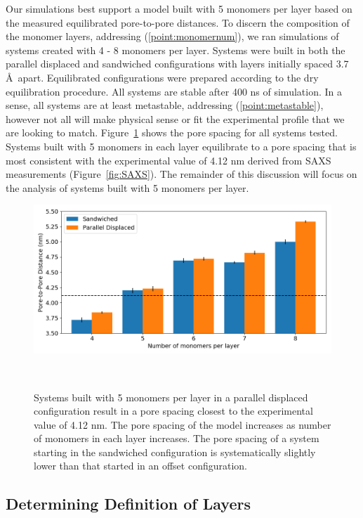 \documentclass{article}
\begin{document}
  Our simulations best support a model built with 5 monomers per layer based on
  the measured equilibrated pore-to-pore distances. To discern the composition of
  the monomer layers, addressing (\ref{point:monomernum}), we ran simulations of
  systems created with 4 - 8 monomers per layer. Systems were built in both the
  parallel displaced and sandwiched configurations with layers initially spaced
  3.7 \AA~apart. Equilibrated configurations were prepared according to the dry
  equilibration procedure. All systems are stable after 400 ns of simulation. In
  a sense, all systems are at least metastable, addressing
  (\ref{point:metastable}), however not all will make physical sense or fit the
  experimental profile that we are looking to match. Figure~\ref{fig:p2p} shows
  the pore spacing for all systems tested. Systems built with 5 monomers in each
  layer equilibrate to a pore spacing that is most consistent with the
  experimental value of 4.12 nm derived from SAXS measurements
  (Figure~\ref{fig:SAXS}). The remainder of this discussion will focus on the
  analysis of systems built with 5 monomers per layer.

  \begin{figure}
	\centering
	\includegraphics[width=\linewidth]{p2p.png}
	\caption{Systems built with 5 monomers per layer in a parallel
		displaced configuration result in a pore spacing closest to the experimental
		value of 4.12 nm. The pore spacing of the model increases as number of monomers
		in each layer increases. The pore spacing of a system starting in the
		sandwiched configuration is systematically slightly lower than that started in
		an offset configuration. }~\label{fig:p2p}
  \end{figure}  

  \subsection{Determining Definition of Layers}
\end{document}
